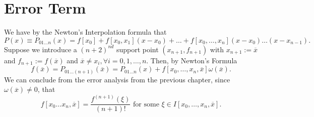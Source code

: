 \section{Error Term}

We have by the Newton's Interpolation formula that 
\[
    P(x) \equiv P_{01\ldots n}(x) = f[x_0] + f[x_0,x_1](x-x_0)+\ldots + f[x_0,\ldots, x_n](x-x_0)\ldots(x-x_{n-1})
.\] 
Suppose we introduce a $(n+2)^{nd}$ support point $(x_{n+1}, f_{n+1})$ with  $x_{n+1} := \overline{x}$ and $f_{n+1} := f(\overline{x})$ and $\overline{x} \neq x_i, \forall i = 0,1,\ldots, n$. Then, by Newton's Formula
\[
    f(\overline{x}) = P_{01\ldots(n+1)}(\overline{x}) = P_{01\ldots n}(x) + f[x_0,\ldots ,x_n,\overline{x}]\omega(\overline{x})
.\] 
We can conclude from the error analysis from the previous chapter, since $\omega (\overline{x}) \neq 0$, that 
\[
    f[x_0\ldots x_{n},\overline{x}] = \frac{f^{(n+1)}(\xi)}{ (n+1)!} \text{ for some } \xi \in I[x_0,\ldots,x_n,\overline{x}]
.\] 
